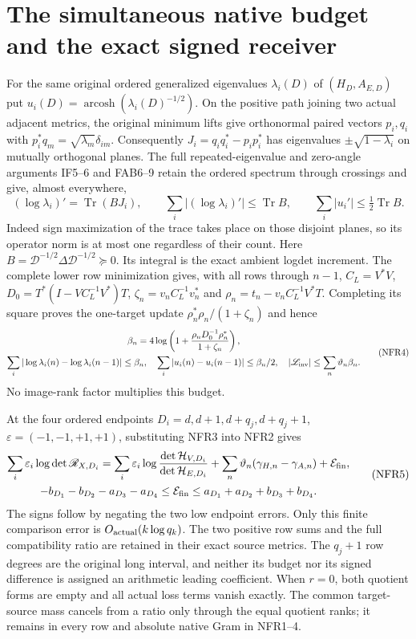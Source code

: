 \documentclass[11pt,a4paper]{article}
\begin{document}
\section{The simultaneous native budget and the exact signed receiver}
For the same original ordered generalized eigenvalues
$\lambda_i(D)$ of $(H_D,A_{E,D})$ put
$u_i(D)=\operatorname{arcosh}(\lambda_i(D)^{-1/2})$.
On the positive path joining two actual adjacent metrics, the original
minimum lifts give orthonormal paired vectors $p_i,q_i$ with
$p_i^*q_m=\sqrt{\lambda_m}\delta_{im}$.
Consequently $J_i=q_iq_i^*-p_ip_i^*$ has eigenvalues
$\pm\sqrt{1-\lambda_i}$ on mutually orthogonal planes.
The full repeated-eigenvalue and zero-angle arguments IF5--6 and
FAB6--9 retain the ordered spectrum through crossings and give,
almost everywhere,
\[
 (\log\lambda_i)'=\operatorname{Tr}(BJ_i),\qquad
 \sum_i|(\log\lambda_i)'|\le\operatorname{Tr}B,\qquad
 \sum_i|u_i'|\le\tfrac12\operatorname{Tr}B .
\]
Indeed sign maximization of the trace takes place on those disjoint
planes, so its operator norm is at most one regardless of their count.
Here $B=\mathcal D^{-1/2}\Delta\mathcal D^{-1/2}\succeq0$.
Its integral is the exact ambient logdet increment. The complete lower
row minimization gives, with all rows through $n-1$,
$C_L=V^*V$, $D_0=T^*(I-VC_L^{-1}V^*)T$,
$\zeta_n=v_nC_L^{-1}v_n^*$ and
$\rho_n=t_n-v_nC_L^{-1}V^*T$.
Completing its square proves the one-target update
$\rho_n^*\rho_n/(1+\zeta_n)$ and hence
\[
\begin{gathered}
 \beta_n=4\log\left(1+
          \frac{\rho_nD_0^{-1}\rho_n^*}{1+\zeta_n}\right),\\
 \sum_i|\log\lambda_i(n)-\log\lambda_i(n-1)|\le\beta_n,\quad
 \sum_i|u_i(n)-u_i(n-1)|\le\beta_n/2,\quad
 |\mathscr L_{\rm inv}|\le\sum_n\vartheta_n\beta_n .
\end{gathered}\tag{NFR4}
\]
No image-rank factor multiplies this budget.

At the four ordered endpoints $D_i=d,d+1,d+q_j,d+q_j+1$,
$\varepsilon=(-1,-1,+1,+1)$, substituting NFR3 into NFR2 gives
\[
\begin{gathered}
 \sum_i\varepsilon_i\log\det\mathscr R_{X,D_i}
  =\sum_i\varepsilon_i
       \log\frac{\det\mathcal H_{V,D_i}}{\det\mathcal H_{E,D_i}}
      +\sum_n\vartheta_n(\gamma_{H,n}-\gamma_{A,n})
      +\mathcal E_{\rm fin},\\
 -b_{D_1}-b_{D_2}-a_{D_3}-a_{D_4}
 \le\mathcal E_{\rm fin}
 \le a_{D_1}+a_{D_2}+b_{D_3}+b_{D_4}.
\end{gathered}\tag{NFR5}
\]
The signs follow by negating the two low endpoint errors.
Only this finite comparison error is $O_{\rm actual}(k\log q_k)$.
The two positive row sums and the full compatibility ratio are
retained in their exact source metrics. The $q_j+1$ row degrees
are the original long interval, and neither its budget nor its
signed difference is assigned an arithmetic leading coefficient.
When $r=0$, both quotient forms are empty and all actual loss terms
vanish exactly. The common target-source mass cancels from a ratio
only through the equal quotient ranks; it remains in every row and
absolute native Gram in NFR1--4.
\end{document}
